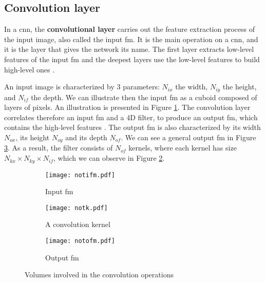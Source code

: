 \subsection{Convolution layer} \label{subs:2dconv}
In a \acrshort{cnn}, the \textbf{convolutional layer} carries out the feature extraction process of the input image, also called the input \acrfull{fm}. It is the main operation on a \acrshort{cnn}, and it is the layer that gives the network its name. The first layer extracts low-level features of the input \acrshort{fm} and the deepest layers use the low-level features to build high-level ones \cite{goodfellow_deep_2016}.

An input image is characterized by 3 parameters: \textbf{$N_{ix}$} the width, \textbf{$N_{iy}$} the height, and \textbf{$N_{if}$} the depth. We can illustrate then the input \acrshort{fm} as a cuboid composed of layers of pixels. An illustration is presented in Figure \ref{fig:notation:ifm}.
The convolution layer correlates therefore an input \acrshort{fm} and a 4D filter, to produce an output \acrshort{fm}, which contains the high-level features \cite{zhao_towards_2018}. The output \acrshort{fm} is also characterized by its width $N_{ox}$, its height $N_{oy}$ and its depth $N_{of}$. We can see a general output \acrshort{fm} in Figure \ref{fig:notation:ofm}. As a result, the filter consists of $N_{of}$ kernels, where each kernel has size $N_{kx} \times N_{ky} \times N_{if}$, which we can observe in Figure \ref{fig:notation:k}.
%
\begin{figure}
    \centering
    \begin{subfigure}{.32\textwidth}
    \centering
    \texttt{[image: notifm.pdf]}
    \caption{Input \acrshort{fm}}
    \label{fig:notation:ifm}
    \end{subfigure}
    \begin{subfigure}{.32\textwidth}
    \centering
    \texttt{[image: notk.pdf]}
    \caption{A convolution kernel}
    \label{fig:notation:k}
    \end{subfigure}
    \begin{subfigure}{.32\textwidth}
    \centering
    \texttt{[image: notofm.pdf]}
    \caption{Output \acrshort{fm}}
    \label{fig:notation:ofm}
    \end{subfigure}
    \caption{Volumes involved in the convolution operations}
    \label{fig:notconv}
\end{figure}

